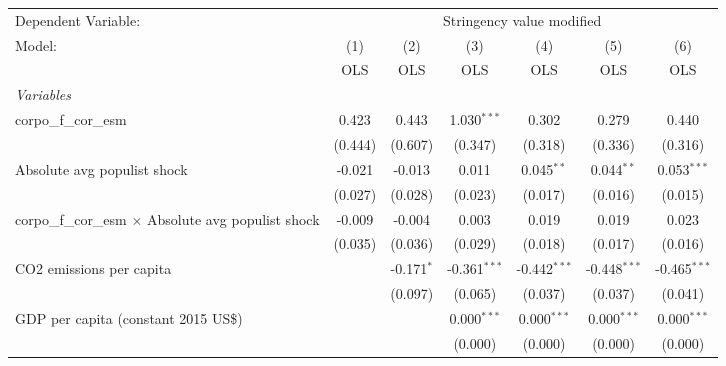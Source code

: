 
\begingroup
\centering
\begin{tabular}{lcccccc}
   \toprule
   Dependent Variable: & \multicolumn{6}{c}{Stringency value modified}\\
   Model:                                                      & (1)     & (2)          & (3)            & (4)            & (5)            & (6)\\  
                                                               &  OLS    & OLS          & OLS            & OLS            & OLS            & OLS\\  
   \midrule
   \emph{Variables}\\
   corpo\_f\_cor\_esm                                          & 0.423   & 0.443        & 1.030$^{***}$  & 0.302          & 0.279          & 0.440\\   
                                                               & (0.444) & (0.607)      & (0.347)        & (0.318)        & (0.336)        & (0.316)\\   
   Absolute avg populist shock                                 & -0.021  & -0.013       & 0.011          & 0.045$^{**}$   & 0.044$^{**}$   & 0.053$^{***}$\\   
                                                               & (0.027) & (0.028)      & (0.023)        & (0.017)        & (0.016)        & (0.015)\\   
   corpo\_f\_cor\_esm $\times$ Absolute avg populist shock     & -0.009  & -0.004       & 0.003          & 0.019          & 0.019          & 0.023\\   
                                                               & (0.035) & (0.036)      & (0.029)        & (0.018)        & (0.017)        & (0.016)\\   
   CO2 emissions per capita                                    &         & -0.171$^{*}$ & -0.361$^{***}$ & -0.442$^{***}$ & -0.448$^{***}$ & -0.465$^{***}$\\   
                                                               &         & (0.097)      & (0.065)        & (0.037)        & (0.037)        & (0.041)\\   
   GDP per capita (constant 2015 US\$)                         &         &              & 0.000$^{***}$  & 0.000$^{***}$  & 0.000$^{***}$  & 0.000$^{***}$\\   
                                                               &         &              & (0.000)        & (0.000)        & (0.000)        & (0.000)\\   

\end{tabular}
